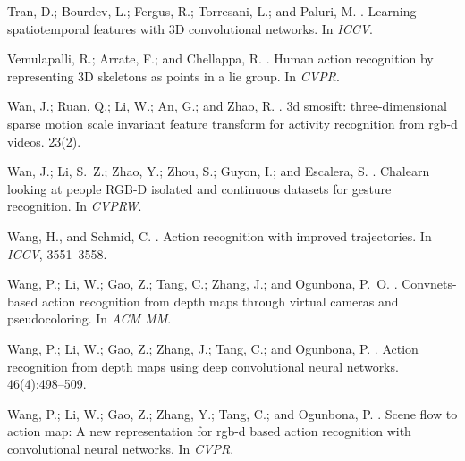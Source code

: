 \documentclass[letterpaper]{article} %
\begin{document}
\begin{thebibliography}{}
Tran, D.; Bourdev, L.; Fergus, R.; Torresani, L.; and Paluri, M.
.
\newblock Learning spatiotemporal features with {3D} convolutional networks.
\newblock In {\em ICCV}.

Vemulapalli, R.; Arrate, F.; and Chellappa, R.
.
\newblock Human action recognition by representing {3D} skeletons as points in
  a lie group.
\newblock In {\em CVPR}.

Wan, J.; Ruan, Q.; Li, W.; An, G.; and Zhao, R.
.
\newblock 3d smosift: three-dimensional sparse motion scale invariant feature
  transform for activity recognition from rgb-d videos.
 23(2).

Wan, J.; Li, S.~Z.; Zhao, Y.; Zhou, S.; Guyon, I.; and Escalera, S.
.
\newblock Chalearn looking at people {RGB-D} isolated and continuous datasets
  for gesture recognition.
\newblock In {\em CVPRW}.

Wang, H., and Schmid, C.
.
\newblock Action recognition with improved trajectories.
\newblock In {\em ICCV},  3551--3558.

Wang, P.; Li, W.; Gao, Z.; Tang, C.; Zhang, J.; and Ogunbona, P.~O.
.
\newblock Convnets-based action recognition from depth maps through virtual
  cameras and pseudocoloring.
\newblock In {\em ACM MM}.

Wang, P.; Li, W.; Gao, Z.; Zhang, J.; Tang, C.; and Ogunbona, P.
.
\newblock Action recognition from depth maps using deep convolutional neural
  networks.
 46(4):498--509.

Wang, P.; Li, W.; Gao, Z.; Zhang, Y.; Tang, C.; and Ogunbona, P.
.
\newblock Scene flow to action map: A new representation for rgb-d based action
  recognition with convolutional neural networks.
\newblock In {\em CVPR}.


\end{thebibliography}
\end{document}
